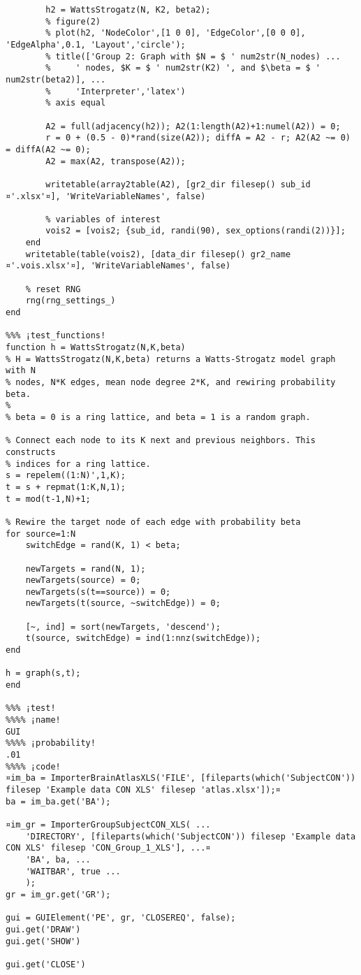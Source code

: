 \documentclass{tufte-handout}
\begin{document}
\begin{lstlisting}
        h2 = WattsStrogatz(N, K2, beta2);
        % figure(2)
        % plot(h2, 'NodeColor',[1 0 0], 'EdgeColor',[0 0 0], 'EdgeAlpha',0.1, 'Layout','circle');
        % title(['Group 2: Graph with $N = $ ' num2str(N_nodes) ...
        %     ' nodes, $K = $ ' num2str(K2) ', and $\beta = $ ' num2str(beta2)], ...
        %     'Interpreter','latex')
        % axis equal

        A2 = full(adjacency(h2)); A2(1:length(A2)+1:numel(A2)) = 0;
        r = 0 + (0.5 - 0)*rand(size(A2)); diffA = A2 - r; A2(A2 ~= 0) = diffA(A2 ~= 0);
        A2 = max(A2, transpose(A2));

        writetable(array2table(A2), [gr2_dir filesep() sub_id ¤'.xlsx'¤], 'WriteVariableNames', false)

        % variables of interest
        vois2 = [vois2; {sub_id, randi(90), sex_options(randi(2))}];
    end
    writetable(table(vois2), [data_dir filesep() gr2_name ¤'.vois.xlsx'¤], 'WriteVariableNames', false)

    % reset RNG
    rng(rng_settings_)
end

%%% ¡test_functions!
function h = WattsStrogatz(N,K,beta)
% H = WattsStrogatz(N,K,beta) returns a Watts-Strogatz model graph with N
% nodes, N*K edges, mean node degree 2*K, and rewiring probability beta.
%
% beta = 0 is a ring lattice, and beta = 1 is a random graph.

% Connect each node to its K next and previous neighbors. This constructs
% indices for a ring lattice.
s = repelem((1:N)',1,K);
t = s + repmat(1:K,N,1);
t = mod(t-1,N)+1;

% Rewire the target node of each edge with probability beta
for source=1:N
    switchEdge = rand(K, 1) < beta;
    
    newTargets = rand(N, 1);
    newTargets(source) = 0;
    newTargets(s(t==source)) = 0;
    newTargets(t(source, ~switchEdge)) = 0;
    
    [~, ind] = sort(newTargets, 'descend');
    t(source, switchEdge) = ind(1:nnz(switchEdge));
end

h = graph(s,t);
end

%%% ¡test!
%%%% ¡name!
GUI
%%%% ¡probability!
.01
%%%% ¡code!
¤im_ba = ImporterBrainAtlasXLS('FILE', [fileparts(which('SubjectCON')) filesep 'Example data CON XLS' filesep 'atlas.xlsx']);¤
ba = im_ba.get('BA');

¤im_gr = ImporterGroupSubjectCON_XLS( ...
    'DIRECTORY', [fileparts(which('SubjectCON')) filesep 'Example data CON XLS' filesep 'CON_Group_1_XLS'], ...¤
    'BA', ba, ...
    'WAITBAR', true ...
    );
gr = im_gr.get('GR');

gui = GUIElement('PE', gr, 'CLOSEREQ', false);
gui.get('DRAW')
gui.get('SHOW')

gui.get('CLOSE')

\end{lstlisting}
\clearpage
\end{document}
